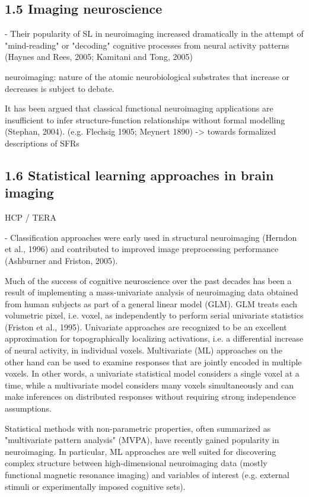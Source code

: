 \documentclass[authoryear,review,3p]{elsarticle}
\begin{document}
\subsection*{1.5 Imaging neuroscience}


- Their popularity of SL in neuroimaging increased dramatically in the attempt of "mind-reading" or "decoding" cognitive processes from neural activity patterns (Haynes and Rees, 2005; Kamitani and Tong, 2005)


neuroimaging: nature of the atomic neurobiological substrates
that increase or decreases is subject to debate.



It has been argued that classical functional neuroimaging applications
are insufficient to infer structure-function relationships
without formal modelling (Stephan, 2004).
(e.g. Flechsig 1905; Meynert 1890)
-> towards formalized descriptions of SFRs


\subsection*{1.6 Statistical learning approaches in brain imaging}

HCP / TERA

- Classification approaches were early used in structural neuroimaging (Herndon et al., 1996) and contributed to improved image preprocessing performance (Ashburner and Friston, 2005).



Much of the success of cognitive neuroscience over the past decades has been a result of implementing a mass-univariate analysis of neuroimaging data obtained from human subjects as part of a general linear model (GLM). GLM treats each volumetric pixel, i.e. voxel, as independently to perform serial univariate statistics (Friston et al., 1995). 
Univariate approaches are recognized to be an excellent approximation for topographically localizing activations, i.e. a differential increase of neural activity, in individual voxels. Multivariate (ML) approaches on the other hand can be used to examine responses that are jointly encoded in multiple voxels. In other words, a univariate statistical model considers a single voxel at a time, while a multivariate model considers many voxels simultaneously and can make inferences on distributed responses without requiring strong independence assumptions. 

Statistical methods with non-parametric properties, often summarized as "multivariate pattern analysis" (MVPA), have recently gained popularity in neuroimaging. In particular, ML approaches are well suited for discovering complex structure between high-dimensional neuroimaging data (mostly functional magnetic resonance imaging) and variables of interest (e.g. external stimuli or experimentally imposed cognitive sets). 
\end{document}
